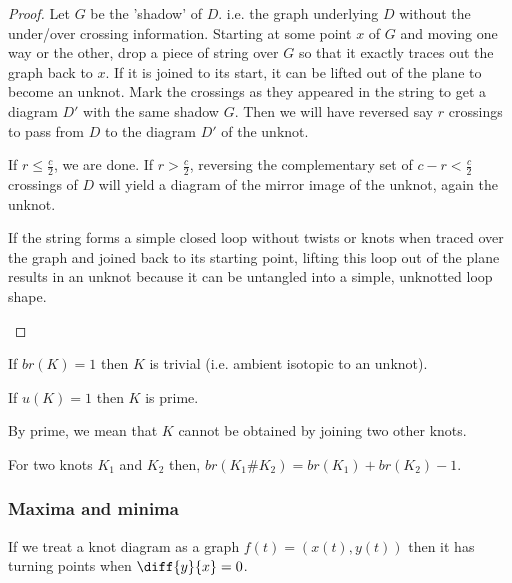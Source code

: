 \documentclass[12pt, a4paper]{article}
\begin{document}
\begin{proof}
    Let \( G \) be the 'shadow' of \( D \). i.e. the graph underlying \( D \) without the under/over crossing information. Starting at some point \( x \) of \( G \) and moving one way or the other, drop a piece of string over \( G \) so that it exactly traces out the graph back to \( x \). If it is joined to its start, it can be lifted out of the plane to become an unknot. Mark the crossings as they appeared in the string to get a diagram \( D' \) with the same shadow \( G \). Then we will have reversed say \( r \) crossings to pass from \( D \) to the diagram \( D' \) of the unknot.

    If \( r \leq \frac{c}{2} \), we are done. If \( r > \frac{c}{2} \), reversing the complementary set of \( c - r < \frac{c}{2} \) crossings of \( D \) will yield a diagram of the mirror image of the unknot, again the unknot.

    \begin{mdnote}
        If the string forms a simple closed loop without twists or knots when traced over the graph and joined back to its starting point, lifting this loop out of the plane results in an unknot because it can be untangled into a simple, unknotted loop shape.
    \end{mdnote}
\end{proof}

\begin{lemma}
    If \(br(K)=1\) then \(K\) is trivial (i.e. ambient isotopic to an unknot).
\end{lemma}

\begin{theorem}
    If \(u(K)=1\) then \(K\) is prime.
\end{theorem}

\begin{mdnote}
    By prime, we mean that \(K\) cannot be obtained by joining two other knots.
\end{mdnote}

\begin{theorem}
    For two knots \(K_1\) and \(K_2\) then, \(br(K_1 \# K_2)=br(K_1)+br(K_2)-1\).
\end{theorem}

\subsubsection{Maxima and minima}

If we treat a knot diagram as a graph \(f(t)=(x(t),y(t))\) then it has turning points when \(\diff{y}{x}=0\). 
\end{document}
